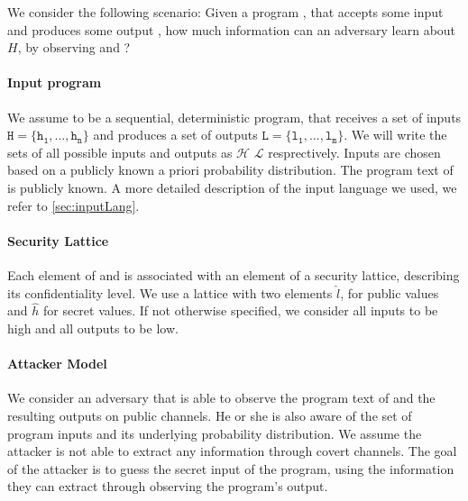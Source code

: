 We consider the following scenario: Given a program \p, that accepts some input \In and produces some output \Out, how much information can an adversary \A learn about $H$, by observing \p and \Out?

\paragraph{Input program} We assume \p to be a sequential, deterministic program, that receives a set of inputs $\mathtt{H = \{h_1, ..., h_n\}}$ and produces a set of outputs $\mathtt{L = \{l_1, ..., l_m\}}$. We will write the sets of all possible inputs and outputs as $\mathcal{H}$ $\mathcal{L}$ resprectively. Inputs are chosen based on a publicly known a priori probability distribution. The program text of \p is publicly known. A more detailed description of the input language we used, we refer to \ref{sec:inputLang}.

\paragraph{Security Lattice} Each element of \In and \Out is associated with an element of a security lattice, describing its confidentiality level. We use a lattice with two elements $\hat{l}$, for public values and $\hat{h}$ for secret values. If not otherwise specified, we consider all inputs to be high and all outputs to be low.

\paragraph{Attacker Model} We consider an adversary \A that is able to observe the program text of \p and the resulting outputs on public channels. He or she is also aware of the set of program inputs and its underlying probability distribution. We assume the attacker is not able to extract any information through covert channels. The goal of the attacker is to guess the secret input of the program, using the information they can extract through observing the program's output.



